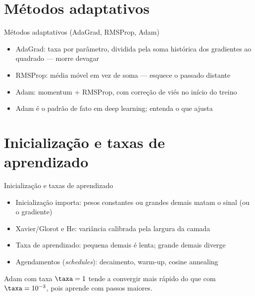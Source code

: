 \documentclass[aspectratio=169, 11pt]{beamer}
\begin{document}
\section{Métodos adaptativos}

\begin{frame}{Métodos adaptativos (AdaGrad, RMSProp, Adam)}
  \begin{itemize}\setlength{\itemsep}{0.4ex}
    \item AdaGrad: taxa por parâmetro, dividida pela soma histórica dos
          gradientes ao quadrado — morre devagar
    \item RMSProp: média móvel em vez de soma — esquece o passado distante
    \item Adam: momentum + RMSProp, com correção de viés no início do treino
    \item Adam é o padrão de fato em deep learning; entenda o que ajusta
  \end{itemize}
\end{frame}

\section{Inicialização e taxas de aprendizado}

\begin{frame}{Inicialização e taxas de aprendizado}
  \begin{itemize}\setlength{\itemsep}{0.4ex}
    \item Inicialização importa: pesos constantes ou grandes demais matam o
          sinal (ou o gradiente)
    \item Xavier/Glorot e He: variância calibrada pela largura da camada
    \item Taxa de aprendizado: pequena demais é lenta; grande demais diverge
    \item Agendamentos (\emph{schedules}): decaimento, warm-up, cosine annealing
  \end{itemize}
  \begin{quizbox}
    Adam com taxa $\taxa = 1$ tende a convergir mais rápido do que com
    $\taxa = 10^{-3}$, pois aprende com passos maiores.

    \smallskip
  \end{quizbox}
\end{frame}
\end{document}
